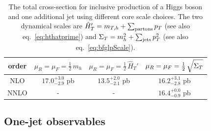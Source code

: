 \begin{table}
  \centering
  \begin{tabular}{c||c|c|c}
    order \vphantom{$\int\limits_a^b$} & $\mu_R=\mu_F=\tfrac{1}{2}\,m_h$ & $\mu_R=\mu_F=\tfrac{1}{2}\,\hat{H}_T'$ & $\mu_R=\mu_F=\tfrac{1}{2}\,\sqrt{\vphantom{\big[}\Sigma_T}$ \\
    \hline\hline
    NLO \vphantom{$\int\limits_a^b$}  & $17.0^{+3.0}_{-2.9}$ pb & $13.5^{+2.0}_{-2.1}$ pb & $16.2^{+3.1}_{-2.8}$ pb \\\hline
    NNLO \vphantom{$\int\limits_a^b$} & -     & -     & $16.4^{+0.0}_{-0.9}$ pb \\
    \hline
  \end{tabular}
  \caption{
    The total cross-section for inclusive production of a Higgs boson and 
    one additional jet using different core scale choices.  The two 
    dynamical scales are $\hat{H}_T'=m_{T,h} + \sum_{\rm partons} p_T$ 
    (see also eq.~\eqref{eq:hthatprime}) and 
    $\Sigma_T = m_h^2 + \sum_{\rm jets} p_T^2$ 
    (see also eq.~\eqref{eq:bfglpScale}).
  }
  \label{tab:H1jXS}
\end{table}


\subsection{One-jet observables}
\label{sec:hjetscomp:results:1jobs}

